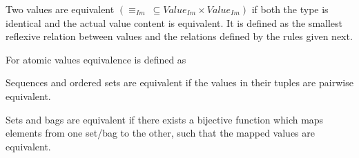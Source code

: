 \begin{defin}
\label{defin:formalisations:ecore_formalisation:instance_models:value_equivalency}
Two values are equivalent $(\equiv_{Im}\: \subseteq Value_{Im} \times Value_{Im})$ if both the type is identical and the actual value content is equivalent. It is defined as the smallest reflexive relation between values and the relations defined by the rules given next.

For atomic values equivalence is defined as
\begin{mathpar}
\end{mathpar}

Sequences and ordered sets are equivalent if the values in their tuples are pairwise equivalent.
\begin{mathpar}
\end{mathpar}
\begin{mathpar}
\end{mathpar}

Sets and bags are equivalent if there exists a bijective function which maps elements from one set/bag
to the other, such that the mapped values are equivalent.
\begin{mathpar}
\end{mathpar}
\begin{mathpar}
\end{mathpar}

\end{defin}

